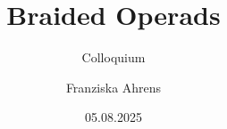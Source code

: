 \usepackage[mathscr]{euscript}
\renewcommand{\P}{\mathscr{P}}
\renewcommand{\S}{\mathscr{S}}
\newcommand{\C}{\mathscr{C}}
\renewcommand{\O}{\mathscr{O}}
\newcommand{\B}{\mathscr{B}}
\newcommand{\D}{\mathscr{D}}
\newcommand{\nerv}{\mathscr{N}}
\newcommand{\W}{\mathscr{W}}
\newcommand{\Fib}{\mathscr{F} \text{ib}}
\newcommand{\Cof}{\mathscr{C} \text{of}}
\newcommand{\M}{\mathscr{M}}
\newcommand{\X}{\mathcal{X}}
\newcommand{\ind}{\text{ind-}\C}
\newcommand{\chains}{\Ch_k^\I}
\newcommand{\Cotimes}{\mathscr{C}^{\otimes}}
\newcommand{\Ox}{\mathscr{O}^{\otimes}}
\newcommand{\Bx}{\mathscr{B}^{\otimes}}
\newcommand{\Bc}{\mathscr{B}_{\text{color}}}
\newcommand{\Fin}{\mathscr{F} \text{in}_{\ast}}
\newcommand{\Brx}{\mathscr{B} \text{r}_{\ast}}
\newcommand{\deltast}{\Delta_{\ast}}
\usepackage{hyperref}


\title{Braided Operads}
\author{Franziska Ahrens}
\subtitle{Colloquium}
\date{05.08.2025}

